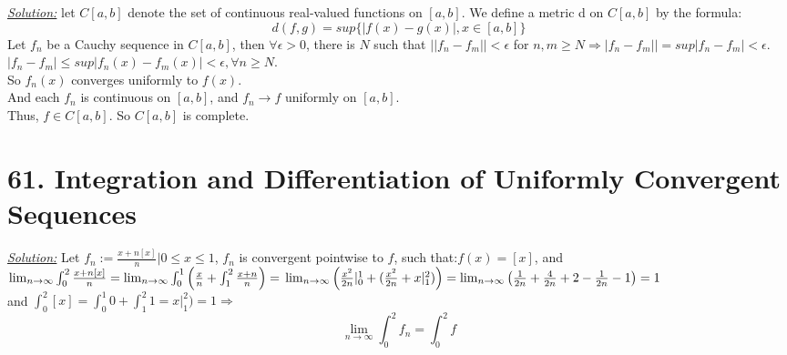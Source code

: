 \documentclass{article}
\begin{document}
\begin{tcolorbox}[enhanced,attach boxed title to top center={yshift=-3mm,yshifttext=-1mm},
  colback=black!5!white,colframe=black!75!black,colbacktitle=red!80!black,
  title=Exercise-60.10:.,fonttitle=\bfseries,
  boxed title style={size=small,colframe=red!50!black} ]
  \textit{ {\color{red}\underline{Solution:}}}
 let $C[a,b]$ denote the set of continuous real-valued functions
on $[a,b]$. We define a metric d on $C[a,b]$ by the formula:
$$d(f,g)=sup\{|f(x)-g(x)|,x\in[a,b]\}$$
Let $f_n$ be a Cauchy sequence in $C[a,b]$, then $\forall\epsilon>0$, there is $N$ such that $||f_n-f_m||<\epsilon$ for $n,m\geq N\Longrightarrow|f_n-f_m||=sup|f_n-f_m|<\epsilon$.\\
$|f_n-f_m|\leq sup|f_n(x)-f_m(x)|<\epsilon,\forall n\geq N$.\\
So $f_n(x)$ converges uniformly to $f(x)$.\\
And each $f_n$ is continuous on $[a,b]$, and $f_n\rightarrow f$ uniformly on $[a,b]$.\\
Thus, $f\in C[a,b]$. So $C[a,b]$ is complete.


\end{tcolorbox}


\section*{61. Integration and Differentiation of Uniformly Convergent
Sequences}

\begin{tcolorbox}[enhanced,attach boxed title to top center={yshift=-3mm,yshifttext=-1mm},
  colback=black!5!white,colframe=black!75!black,colbacktitle=red!80!black,
  title=Exercise-61.1:.,fonttitle=\bfseries,
  boxed title style={size=small,colframe=red!50!black} ]
  \textit{ {\color{red}\underline{Solution:}}}
Let $f_n:=\frac{x+n[x]}{n}| 0\leq x\leq 1$, $f_n$ is convergent pointwise to $f$, such that:$f(x)=[x]$, and\\
$\lim_{n\to\infty}\int_0^2 \frac{x+n[x]}{n}=\lim_{n\to\infty}\int_0^1
\left(\frac{x}{n}+\int_1^2 \frac{x+n}{n}\right)=\\
\lim_{n\to\infty}\left(\frac{x^2}{2n}|_0^1+(\frac{x^2}{2n}+x|_1^2)\right)=\lim_{n\to\infty}\left(\frac{1}{2n}+\frac{4}{2n}+2-\frac{1}{2n}-1\right)=1$\\
and $\int_0^2 [x]=\int_0^1 0+\int_1^2 1=x|_1^2)=1\Rightarrow$
$$\lim_{n\to\infty}\int_0^2 f_n=\int_0^2 f$$
\end{tcolorbox}

\end{document}
